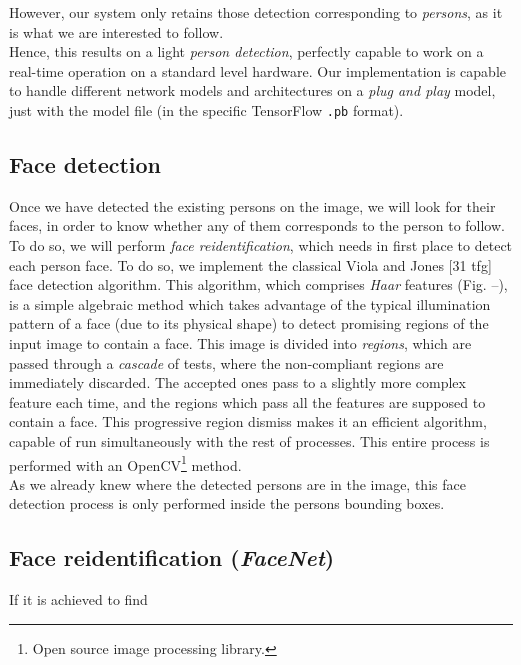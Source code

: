 However, our system only retains those detection corresponding to \emph{persons}, as it is what we are interested to follow.\\


Hence, this results on a light \emph{person detection}, perfectly capable to work on a real-time operation on a standard level hardware. Our implementation is capable to handle different network models and architectures on a \emph{plug and play} model, just with the model file (in the specific TensorFlow \texttt{.pb} format).



\subsection{Face detection}

Once we have detected the existing persons on the image, we will look for their faces, in order to know whether any of them corresponds to the person to follow. To do so, we will perform \emph{face reidentification}, which needs in first place to detect each person face. To do so, we implement the classical Viola and Jones [31 tfg] face detection algorithm. This algorithm, which comprises \emph{Haar} features (Fig. --), is a simple algebraic method which takes advantage of the typical illumination pattern of a face (due to its physical shape) to detect promising regions of the input image to contain a face. This image is divided into \emph{regions}, which are passed through a \emph{cascade} of tests, where the non-compliant regions are immediately discarded. The accepted ones pass to a slightly more complex feature each time, and the regions which pass all the features are supposed to contain a face. This progressive region dismiss makes it an efficient algorithm, capable of run simultaneously with the rest of processes. This entire process is performed with an OpenCV\footnote{Open source image processing library.} method.\\

As we already knew where the detected persons are in the image, this face detection process is only performed inside the persons bounding boxes.



\subsection{Face reidentification (\emph{FaceNet})}

If it is achieved to find 










